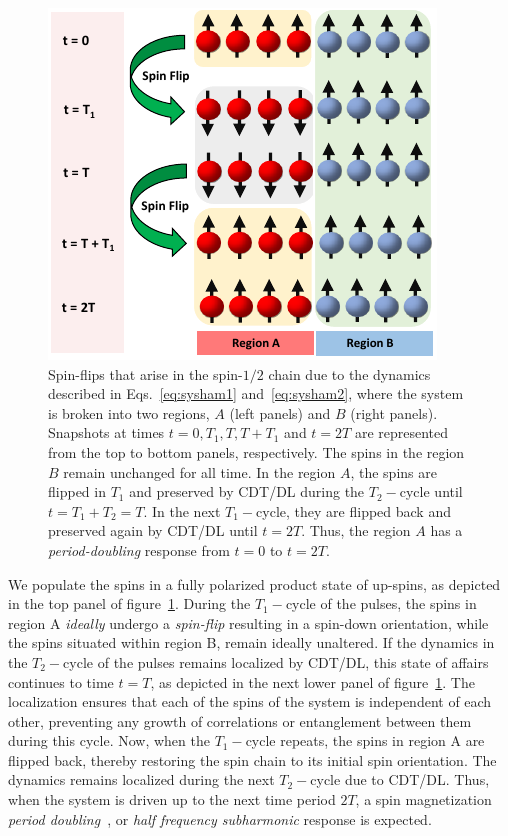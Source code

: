 \documentclass[12pt]{iopart}
\begin{document}
\begin{figure}[t!]
    \centering
    \includegraphics[width=7.cm]{figure2.pdf}
    \caption{Spin-flips that arise in the spin-$1/2$ chain due to the dynamics described in Eqs.~\ref{eq:sysham1} and~\ref{eq:sysham2}, where the system is broken into two regions, $A$ (left panels) and $B$ (right panels). Snapshots at times $t=0, T_1, T, T+T_1 $ and $t=2T$ are represented from the top to bottom panels, respectively. The spins in the region $B$ remain unchanged for all time. In the region $A$, the spins are flipped in $T_1$ and preserved by CDT/DL during the $T_2-$cycle until $t=T_1+T_2=T$. In the next $T_1-$cycle, they are flipped back and preserved again by CDT/DL until $t=2T$. Thus, the region $A$ has a \textit{period-doubling} response from $t=0$ to $t=2T$.}
    \label{Fig:spinflip}
\end{figure}
	
	We populate the spins in a fully polarized product state of up-spins, as depicted in the top panel of figure~\ref{Fig:spinflip}. During the $T_1-$cycle of the pulses,  the spins in region A \textit{ideally} undergo a \textit{spin-flip} resulting in a spin-down orientation, while the spins situated within region B, remain ideally unaltered. If the dynamics in the $T_2-$cycle of the pulses remains localized by CDT/DL, this state of affairs continues to time $t=T$, as depicted in the next lower panel of figure~\ref{Fig:spinflip}. The localization ensures that each of the spins of the system is independent of each other, preventing any growth of correlations or entanglement between them during this cycle. Now, when the $T_1-$cycle repeats, the spins in region A are flipped back, thereby restoring the spin chain to its initial spin orientation. The dynamics remains localized during the next $T_2-$cycle due to CDT/DL. Thus, when the system is driven up to the next time period $2T$, a spin magnetization \textit{period doubling}~\cite{rovny_31mathrmp_2018, Pan2020}, or \textit{half frequency subharmonic} response is expected. 
	
\end{document}

